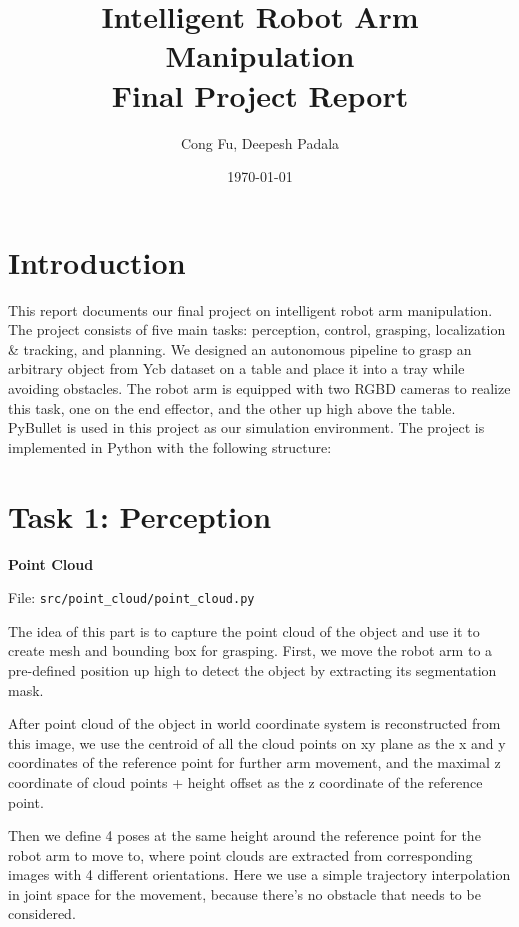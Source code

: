 \documentclass[
	english,
	accentcolor=11d,%
	type=intern,
	marginpar=false,
    logofile=media/PEARLTUDA.png
	]{tudapub}
\let\code\texttt
\begin{document}
\title{Intelligent Robot Arm Manipulation\\Final Project Report}
\author{Cong Fu, Deepesh Padala}
\date{\today} %
\maketitle
\tableofcontents

\section{Introduction}
This report documents our final project on intelligent robot arm manipulation. The project consists of five main tasks: perception, control, grasping, localization \& tracking, and planning. We designed an autonomous pipeline to grasp an arbitrary object from Ycb dataset on a table and place it into a tray while avoiding obstacles. The robot arm is equipped with two RGBD cameras to realize this task, one on the end effector, and the other up high above the table. PyBullet is used in this project as our simulation environment. The project is implemented in Python with the following structure:

\section{Task 1: Perception}

\noindent\textbf{Point Cloud}

\noindent File: \code{src/point\_cloud/point\_cloud.py}

The idea of this part is to capture the point cloud of the object and use it to create mesh and bounding box for grasping. First, we move the robot arm to a pre-defined position up high to detect the object by extracting its segmentation mask. 

After point cloud of the object in world coordinate system is reconstructed from this image, we use the centroid of all the cloud points on xy plane as the x and y coordinates of the reference point for further arm movement, and the maximal z coordinate of cloud points + height offset as the z coordinate of the reference point.

Then we define 4 poses at the same height around the reference point for the robot arm to move to, where point clouds are extracted from corresponding images with 4 different orientations. Here we use a simple trajectory interpolation in joint space for the movement, because there's no obstacle that needs to be considered.
\end{document}
